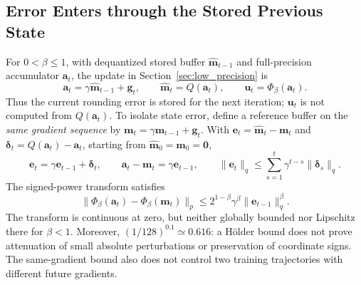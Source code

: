 \documentclass{article}
\begin{document}
\subsection{Error Enters through the Stored Previous State}
For $0<\beta\le1$, with dequantized stored buffer $\widehat{\mathbf{m}}_{t-1}$ and full-precision accumulator $\mathbf{a}_t$, the update in Section~\ref{sec:low_precision} is
\begin{equation}\label{eq:quant-recursion}
\mathbf{a}_t=\gamma\widehat{\mathbf{m}}_{t-1}+\mathbf{g}_t,\qquad
\widehat{\mathbf{m}}_t=Q(\mathbf{a}_t),\qquad \mathbf{u}_t=\Phi_\beta(\mathbf{a}_t).
\end{equation}
Thus the current rounding error is stored for the next iteration; $\mathbf{u}_t$ is not computed from $Q(\mathbf{a}_t)$. To isolate state error, define a reference buffer on the \emph{same gradient sequence} by $\mathbf{m}_t=\gamma \mathbf{m}_{t-1}+\mathbf{g}_t$. With $\mathbf{e}_t=\widehat{\mathbf{m}}_t-\mathbf{m}_t$ and $\bm{\delta}_t=Q(\mathbf{a}_t)-\mathbf{a}_t$, starting from $\widehat{\mathbf m}_0=\mathbf m_0=\mathbf0$,
\begin{equation}
\mathbf{e}_t=\gamma \mathbf{e}_{t-1}+\bm{\delta}_t,\qquad
\mathbf{a}_t-\mathbf{m}_t=\gamma \mathbf{e}_{t-1},\qquad
\|\mathbf{e}_t\|_q\le\sum_{s=1}^t\gamma^{t-s}\|\bm{\delta}_s\|_q.
\end{equation}
The signed-power transform satisfies
\begin{equation}\label{eq:quant-holder}
\|\Phi_\beta(\mathbf{a}_t)-\Phi_\beta(\mathbf{m}_t)\|_p
\le2^{1-\beta}\gamma^\beta\|\mathbf{e}_{t-1}\|_q^\beta.
\end{equation}
The transform is continuous at zero, but neither globally bounded nor Lipschitz there for $\beta<1$. Moreover, $(1/128)^{0.1}\simeq0.616$: a H\"older bound does not prove attenuation of small absolute perturbations or preservation of coordinate signs. The same-gradient bound also does not control two training trajectories with different future gradients.
\end{document}
